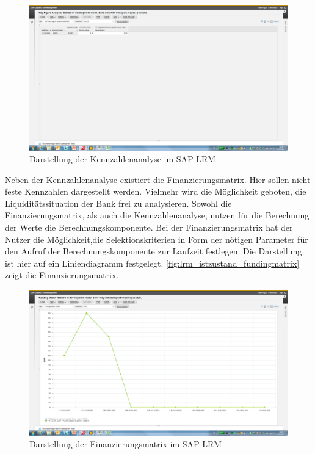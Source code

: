 \begin{onehalfspacing}
\begin{figure}[h]
\centering
\setlength{\unitlength}{1mm}
\includegraphics[width=15cm]{images/KeyFigureAnalysis_Example.png}
\caption{Darstellung der Kennzahlenanalyse im SAP LRM\label{fig:lrm_istzustand_keyfigureanalysis}}
\end{figure}

Neben der Kennzahlenanalyse existiert die Finanzierungsmatrix. Hier sollen nicht feste Kennzahlen dargestellt werden. Vielmehr wird  die Möglichkeit geboten, die Liquiditätssituation der Bank frei zu analysieren. Sowohl die Finanzierungsmatrix, als auch die Kennzahlenanalyse, nutzen für die Berechnung der Werte die Berechnungskomponente. Bei der Finanzierungsmatrix hat der Nutzer die Möglichkeit,die Selektionskriterien in Form der nötigen Parameter für den Aufruf der Berechnungskomponente zur Laufzeit festlegen. Die Darstellung ist hier auf ein Liniendiagramm festgelegt. \vref{fig:lrm_istzustand_fundingmatrix} zeigt die Finanzierungsmatrix.

\begin{figure}[h]
\centering
\setlength{\unitlength}{1mm}
\includegraphics[width=15cm]{images/Funding_Matrix_Example.png}
\caption{Darstellung der Finanzierungsmatrix im SAP LRM\label{fig:lrm_istzustand_fundingmatrix}}
\end{figure}


\end{onehalfspacing}
